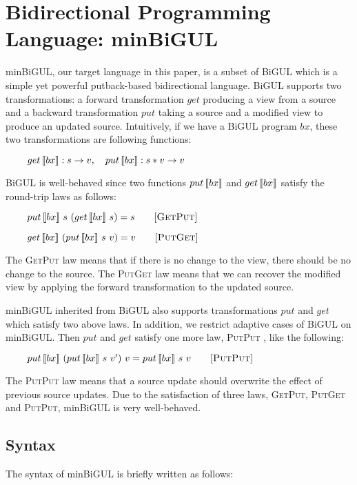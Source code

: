 \section{Bidirectional Programming Language: minBiGUL} \label{sect:minbigul}

minBiGUL, our target language in this paper, is a subset of BiGUL which is a simple yet powerful putback-based bidirectional language. BiGUL supports two transformations: a forward transformation $get$ producing a view from a source and a backward transformation $put$ taking a source and a modified view to produce an updated source. Intuitively, if we have a BiGUL program $bx$, these two transformations are following functions:

    $\hspace*{3mm} \ \quad get \, [\![bx]\!] : s \to v, \quad put \, [\![bx]\!] : s * v \to v$

BiGUL is well-behaved \cite{Pacheco:2014:MCP:2543728.2543737} since two functions $put \, [\![bx]\!]$ and $get \, [\![bx]\!]$ satisfy the round-trip laws as follows:
    
    $\hspace*{3mm} \ \quad put \, [\![bx]\!] \ s \ (get \, [\![bx]\!] \ s) = s \qquad [\textsc{GetPut}]$
    
    $\hspace*{3mm} \ \quad get \, [\![bx]\!] \ (put \, [\![bx]\!] \ s \ v) = v \qquad [\textsc{PutGet}]$

The \textsc{GetPut} law means that if there is no change to the view, there should be no change to the source. The \textsc{PutGet} law means that we can recover the modified view by applying the forward transformation to the updated source.

minBiGUL inherited from BiGUL also supports transformations $put$ and $get$ which satisfy two above laws. In addition, we restrict adaptive cases of BiGUL on minBiGUL. Then $put$ and $get$ satisfy one more law, \textsc{PutPut} \cite{Foster:2007:CBT:1232420.1232424}, like the following:

    $\hspace*{3mm} \ \quad put \, [\![bx]\!] \ (put \, [\![bx]\!] \ s \ v') \ v = put \, [\![bx]\!] \ s \ v \qquad [\textsc{PutPut}]$

The \textsc{PutPut} law means that a source update should overwrite the effect of previous source updates. Due to the satisfaction of three laws, \textsc{GetPut}, \textsc{PutGet} and \textsc{PutPut}, minBiGUL is very well-behaved.

\subsection{Syntax}

The syntax of minBiGUL is briefly written as follows:

